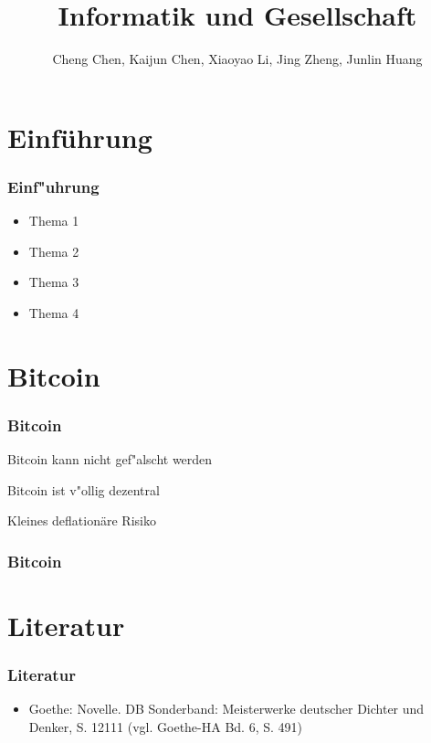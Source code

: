 \documentclass[ddcfooter]{tudbeamer}
\begin{document}
\title[Informatik und Gesellschaft]{Informatik und Gesellschaft}
\author{Cheng Chen, Kaijun Chen, Xiaoyao Li, Jing Zheng, Junlin Huang}
\maketitle

\section{Einführung}
\begin{frame}
\frametitle{Einf"uhrung}
\begin{itemize}
\item Thema 1
\item Thema 2
\item Thema 3
\item Thema 4
\end{itemize}
\end{frame}

\section{Bitcoin}

\begin{frame}
\frametitle{Bitcoin}
\item Bitcoin kann nicht gef"alscht werden
\item Bitcoin ist v"ollig dezentral
\item Kleines deflationäre Risiko
\end{frame}

\begin{frame}
\frametitle{Bitcoin}
\end{frame}

\section{Literatur}
\begin{frame}
\frametitle{Literatur}
\begin{itemize}
\item Goethe: Novelle. DB Sonderband: Meisterwerke deutscher Dichter und Denker, S. 12111 (vgl. Goethe-HA Bd. 6, S. 491)
\end{itemize}
\end{frame}

 
\end{document}
